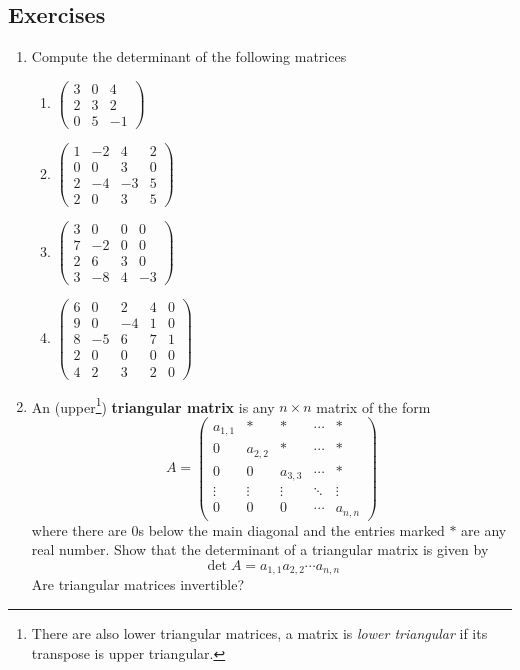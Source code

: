 \documentclass[12pt]{article}
\numberwithin{equation}{subsection}
\numberwithin{figure}{subsection}
\theoremstyle{note}
\begin{document}
\subsection{Exercises}
\begin{enumerate}[label=\arabic*.]

\item Compute the determinant of the following matrices
\begin{enumerate}
	\item $\begin{pmatrix} 3 & 0 & 4 \\ 2 & 3 & 2 \\ 0 & 5 & -1  \end{pmatrix}$
	\item $\begin{pmatrix} 1 & -2 & 4 & 2 \\ 0 & 0 & 3 & 0 \\ 2 & -4 & -3 & 5 \\ 2 & 0 & 3 & 5\end{pmatrix}$
	\item $\begin{pmatrix} 3 & 0 & 0 & 0 \\ 7 & -2 & 0 & 0 \\ 2 & 6 & 3 & 0 \\ 3 & -8 & 4 & -3  \end{pmatrix}$
	\item $\begin{pmatrix} 6 & 0 & 2 & 4 & 0 \\ 9 & 0 & -4 & 1 & 0  \\ 8 & -5 & 6 & 7 & 1 \\ 2 & 0 & 0 & 0 & 0 \\ 4 & 2 & 3 & 2 & 0 \end{pmatrix}$
\end{enumerate}

\item An (upper\footnote{There are also lower triangular matrices, a matrix is \textit{lower triangular} if its transpose is upper triangular.}) \textbf{triangular matrix} is any $n\times n$ matrix of the form \[ A=\begin{pmatrix} a_{1,1} & * & * & \cdots & * \\
0 & a_{2,2} & * & \cdots & * \\
0 & 0 & a_{3,3} & \cdots & * \\
\vdots & \vdots  & \vdots & \ddots & \vdots \\
0 & 0 & 0 & \cdots & a_{n,n} \end{pmatrix}\]
where there are 0s below the main diagonal and the entries marked $*$ are any real number. Show that the determinant of a triangular matrix is given by \[ \det A= a_{1,1} a_{2,2} \cdots a_{n,n}\]
Are triangular matrices invertible? 


\end{enumerate}
\end{document}
